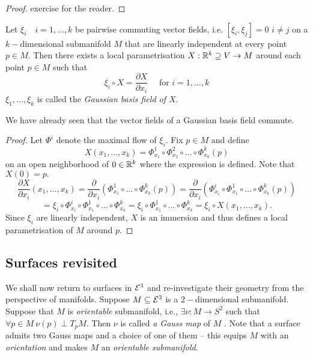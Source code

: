 \begin{proof}
exercise for the reader.
\end{proof}

\begin{theorem, definition}
	
	Let $ \xi_i \quad i = 1, \dots, k $ be pairwise commuting vector fields, i.e. $ [\xi_i,\xi_j]= 0 $  $ i \neq j $ on a $ k-$dimensional submanifold $ M $ that are linearly independent at every point $ p \in M $. Then there exists a local parametrisation $ X : \mathbb R^k \supseteq V \rightarrow M $ around each point $ p \in M $ such that 
		\[ \xi_i \circ X = \dfrac{\partial X}{\partial x_i}\quad \text{ for } i = 1, \dots, k \]
	$ \xi_1, \dots, \xi_k $ is called the \emph{Gaussian basis field of $ X $}.
	
\end{theorem, definition}

\begin{remark}
	
	We have already seen that the vector fields of a Gaussian basis field commute.
	
\end{remark}

\begin{proof}
	
	Let $ \Phi^i $ denote the maximal flow of $ \xi_i $. Fix $ p \in M $ and define 
		\[ X(x_1,\dots, x_k)= \Phi^1_{x_1}\circ \Phi^2_{x_2}\circ \dots \circ \Phi^k_{x_k}(p) \]
	on an open neighborhood of $ 0 \in \mathbb R^k $ where the expression is defined.
	Note that $ X(0)=p. $
		\[ \dfrac{\partial X}{\partial x_i}(x_1,\dots,x_k) = \dfrac{\partial}{\partial x_i} (\Phi^1_{x_1}\circ \dots \circ \Phi^k_{x_k}(p)) = \dfrac{\partial}{\partial x_i} (\Phi^i_{x_i} \circ \Phi^1_{x_1}\circ \dots \circ \Phi^k_{x_k}(p))  \]	
		\[ = \xi_i \circ \Phi^i_{x_i} \circ \Phi^1_{x_1} \circ \dots \circ \Phi^k_{x_k} = \xi_i \circ \Phi^1_{x_1} \circ \dots \circ \Phi^k_{x_k} = \xi_i \circ X(x_1, \dots, x_k).  \]
	Since $ \xi_i $ are linearly independent, $ X $ is an immersion and thus defines a local parametrisation of $ M $ around $ p $.
		
\end{proof}

\subsection{Surfaces revisited}

We shall now return to surfaces in $ \mathcal E^3 $ and re-investigate their geometry from the perspective of manifolds.
Suppose $ M \subseteq \mathcal E^3 $ is a $ 2-$dimensional submanifold. Suppose that $ M $ is \emph{orientable} submanifold, i.e., $ \exists \nu: M \rightarrow S^2 $ such that $ \forall p \in M ~ \nu(p) \perp T_pM $. Then $ \nu $ is called \emph{a Gauss map } of $ M $ . Note that a surface admits two Gauss maps and a choice of one of them -- this equips $ M $ with an \emph{orientation} and makes $ M $ an \emph{orientable submanifold}.

